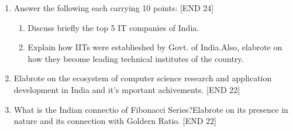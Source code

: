 \documentclass[12pt]{article}
\begin{document}
\begin{enumerate}
			\item Answer the following each carrying 10 points: \hfill{[END 24]}
			
			\begin{enumerate}
				\item Discuss briefly the top 5 IT companies of India.
				\item Explain how IITs were establieshed by Govt. of India.Also, elabrote on how they become leading technical institutes of the country.
			\end{enumerate}
			
			\item Elabrote on the ecosystem of computer science research and application development in India and it's mportant achivements. \hfill{[END 22]}
			
			\item What is the Indian connectio of Fibonacci Series?Elabrote on its presence in nature and its connection with Goldern Ratio. \hfill{[END 22]}
	\end{enumerate}
\end{document}
